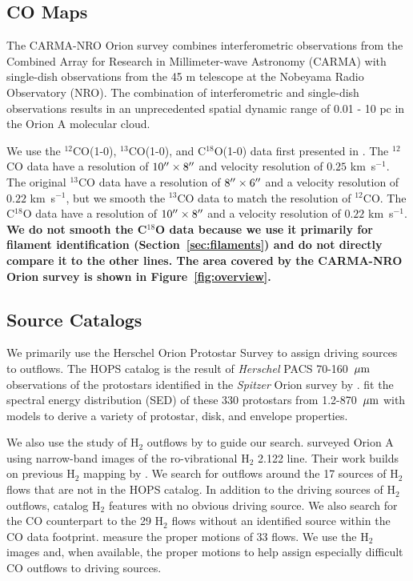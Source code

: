 \documentclass[twocolumn]{aastex63}
\newcommand{\kms}{km~s$^{-1}$}
\newcommand{\co}[1][]{\ensuremath{^{#1}}CO}
\begin{document}
\subsection{CO Maps}
The CARMA-NRO Orion survey combines interferometric observations from the Combined Array for Research in Millimeter-wave Astronomy (CARMA) with single-dish observations from the 45 m telescope at the Nobeyama Radio Observatory (NRO). The combination of interferometric and single-dish observations results in an unprecedented spatial dynamic range of 0.01 - 10 pc in the Orion A molecular cloud.

We use the \co[12](1-0), \co[13](1-0), and C$^{18}$O(1-0) data first presented in \citet{Kong18}. The \co[12]{} data have a resolution of $10\mbox{$^{\prime\prime}$}\times8\mbox{$^{\prime\prime}$}$ and velocity resolution of $0.25$ \kms{}. The original \co[13]{} data have a resolution of $8\mbox{$^{\prime\prime}$}\times6\mbox{$^{\prime\prime}$}$ and a velocity resolution of $0.22$ \kms{}, but we smooth the \co[13]{} data to match the resolution of \co[12]{}. The C$^{18}$O data have a resolution of $10\mbox{$^{\prime\prime}$}\times8\mbox{$^{\prime\prime}$}$ and a velocity resolution of $0.22$ \kms{}. \textbf{We do not smooth the C$^{18}$O data because we use it primarily for filament identification (Section~\ref{sec:filaments}) and do not directly compare it to the other lines. The area covered by the CARMA-NRO Orion survey is shown in Figure~\ref{fig:overview}.}

\subsection{Source Catalogs}
We primarily use the Herschel Orion Protostar Survey \citep[HOPS;][]{Furlan16} to assign driving sources to outflows. The HOPS catalog is the result of \emph{Herschel} PACS 70-160~$\mbox{$\mu$m}{}$ observations of the protostars identified in the \emph{Spitzer} Orion survey by \citet{Megeath12}. \citet{Furlan16} fit the spectral energy distribution (SED) of these 330 protostars from 1.2-870~$\mbox{$\mu$m}{}$ with models to derive a variety of protostar, disk, and envelope properties.

We also use the study of H$_2$ outflows by \citet{Davis09} to guide our search. \citet{Davis09} surveyed Orion A using narrow-band images of the ro-vibrational H$_2$ 2.122 \micron{} line. Their work builds on previous H$_2$ mapping by \citet{Stanke02}. We search for outflows around the 17 sources of H$_2$ flows that are not in the HOPS catalog. In addition to the driving sources of H$_2$ outflows, \citet{Davis09} catalog H$_2$ features with no obvious driving source. We also search for the CO counterpart to the 29 H$_2$ flows without an identified source within the CO data footprint. \citet{Davis09} measure the proper motions of 33 flows. We use the H$_2$ images and, when available, the proper motions to help assign especially difficult CO outflows to driving sources.
\end{document}
